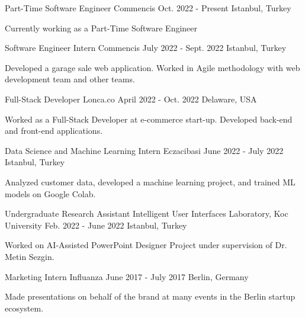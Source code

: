 
\begin{cventries}

  \cventry
    {Part-Time Software Engineer}
    {Commencis}
    {Oct. 2022 - Present}
    {Istanbul, Turkey}
    {
      \begin{cvitems}
        \item {Currently working as a Part-Time Software Engineer}
      \end{cvitems}
    }

  \cventry
    {Software Engineer Intern}
    {Commencis}
    {July 2022 - Sept. 2022}
    {Istanbul, Turkey}
    {
      \begin{cvitems}
        \item {Developed a garage sale web application. Worked in Agile methodology with web development team and other teams.}
      \end{cvitems}
    }

  \cventry
    {Full-Stack Developer}
    {Lonca.co}
    {April 2022 - Oct. 2022}
    {Delaware, USA}
    {
      \begin{cvitems}
        \item {Worked as a Full-Stack Developer at e-commerce start-up. Developed back-end and front-end applications.}
      \end{cvitems}
    }

  \cventry
    {Data Science and Machine Learning Intern}
    {Eczacibasi}
    {June 2022 - July 2022}
    {Istanbul, Turkey}
    {
      \begin{cvitems}
        \item {Analyzed customer data, developed a machine learning project, and trained ML models on Google Colab.}
      \end{cvitems}
    }

  \cventry
    {Undergraduate Research Assistant}
    {Intelligent User Interfaces Laboratory, Koc University}
    {Feb. 2022 - June 2022}
    {Istanbul, Turkey}
    {
      \begin{cvitems}
        \item {Worked on AI-Assisted PowerPoint Designer Project under supervision of Dr. Metin Sezgin.}
      \end{cvitems}
    }

  \cventry
    {Marketing Intern}
    {Influanza}
    {June 2017 - July 2017}
    {Berlin, Germany}
    {
      \begin{cvitems}
        \item {Made presentations on behalf of the brand at many events in the Berlin startup ecosystem.}
      \end{cvitems}
    }


\end{cventries}
